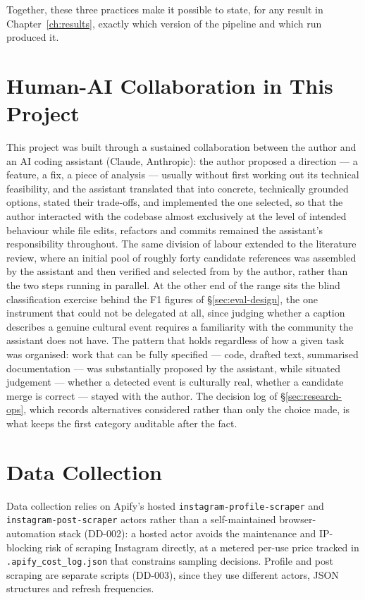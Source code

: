 \documentclass[12pt, a4paper]{report}
\begin{document}
Together, these three practices make it possible to state, for any
result in Chapter~\ref{ch:results}, exactly which version of the
pipeline and which run produced it.

\section{Human-AI Collaboration in This Project}
\label{sec:ai-collaboration}

This project was built through a sustained collaboration between the
author and an AI coding assistant (Claude, Anthropic): the author
proposed a direction — a feature, a fix, a piece of analysis — usually
without first working out its technical feasibility, and the assistant
translated that into concrete, technically grounded options, stated
their trade-offs, and implemented the one selected, so that the author
interacted with the codebase almost exclusively at the level of intended
behaviour while file edits, refactors and commits remained the
assistant's responsibility throughout. The same division of labour
extended to the literature review, where an initial pool of roughly
forty candidate references was assembled by the assistant and then
verified and selected from by the author, rather than the two steps
running in parallel. At the other end of the range sits the blind
classification exercise behind the F1 figures of
\S\ref{sec:eval-design}, the one instrument that could not be delegated
at all, since judging whether a caption describes a genuine cultural
event requires a familiarity with the community the assistant does not
have. The pattern that holds regardless of how a given task was
organised: work that can be fully specified — code, drafted text,
summarised documentation — was substantially proposed by the assistant,
while situated judgement — whether a detected event is culturally real,
whether a candidate merge is correct — stayed with the author. The
decision log of \S\ref{sec:research-ops}, which records alternatives
considered rather than only the choice made, is what keeps the first
category auditable after the fact.

\section{Data Collection}
\label{sec:data-collection}

Data collection relies on Apify's hosted \texttt{instagram-profile-scraper}
and \texttt{instagram-post-scraper} actors rather than a self-maintained
browser-automation stack (DD-002): a hosted actor avoids the maintenance
and IP-blocking risk of scraping Instagram directly, at a metered
per-use price tracked in \texttt{.apify\_cost\_log.json} that constrains
sampling decisions. Profile and post scraping are separate scripts
(DD-003), since they use different actors, JSON structures and refresh
frequencies.
\end{document}
